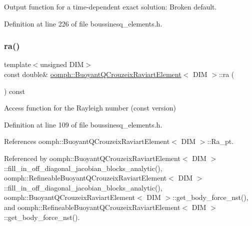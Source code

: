 Output function for a time-\/dependent exact solution\+: Broken default. 



Definition at line 226 of file boussinesq\+\_\+elements.\+h.

\mbox{\label{classoomph_1_1BuoyantQCrouzeixRaviartElement_a5876310641d9f5028de6d4263013e247}} 
\subsubsection{\texorpdfstring{ra()}{ra()}}
{\footnotesize\ttfamily template$<$unsigned D\+IM$>$ \\
const double\& \hyperlink{classoomph_1_1BuoyantQCrouzeixRaviartElement}{oomph\+::\+Buoyant\+Q\+Crouzeix\+Raviart\+Element}$<$ D\+IM $>$\+::ra (\begin{DoxyParamCaption}{ }\end{DoxyParamCaption}) const\hspace{0.3cm}{\ttfamily [inline]}}



Access function for the Rayleigh number (const version) 



Definition at line 109 of file boussinesq\+\_\+elements.\+h.



References oomph\+::\+Buoyant\+Q\+Crouzeix\+Raviart\+Element$<$ D\+I\+M $>$\+::\+Ra\+\_\+pt.



Referenced by oomph\+::\+Buoyant\+Q\+Crouzeix\+Raviart\+Element$<$ D\+I\+M $>$\+::fill\+\_\+in\+\_\+off\+\_\+diagonal\+\_\+jacobian\+\_\+blocks\+\_\+analytic(), oomph\+::\+Refineable\+Buoyant\+Q\+Crouzeix\+Raviart\+Element$<$ D\+I\+M $>$\+::fill\+\_\+in\+\_\+off\+\_\+diagonal\+\_\+jacobian\+\_\+blocks\+\_\+analytic(), oomph\+::\+Buoyant\+Q\+Crouzeix\+Raviart\+Element$<$ D\+I\+M $>$\+::get\+\_\+body\+\_\+force\+\_\+nst(), and oomph\+::\+Refineable\+Buoyant\+Q\+Crouzeix\+Raviart\+Element$<$ D\+I\+M $>$\+::get\+\_\+body\+\_\+force\+\_\+nst().

\mbox{\label{classoomph_1_1BuoyantQCrouzeixRaviartElement_afa4d4ff16fa307b16feab1de7aaa90b6}} 
